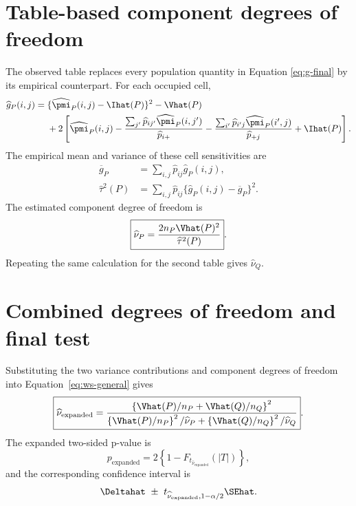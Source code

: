 \section{Table-based component degrees of freedom}

The observed table replaces every population quantity in Equation
\eqref{eq:g-final} by its empirical counterpart. For each occupied cell,
\begin{equation}
\begin{aligned}
\widehat g_P(i,j)
={}&\{\widehat\pmi_P(i,j)-\Ihat(P)\}^2-\Vhat(P)\\
&+2\left[
\widehat\pmi_P(i,j)
-\frac{\sum_{j'}\widehat p_{ij'}\widehat\pmi_P(i,j')}
       {\widehat p_{i+}}
-\frac{\sum_{i'}\widehat p_{i'j}\widehat\pmi_P(i',j)}
       {\widehat p_{+j}}
+\Ihat(P)
\right].
\end{aligned}
\label{eq:g-hat}
\end{equation}
The empirical mean and variance of these cell sensitivities are
\begin{align}
  \overline g_P
  &=\sum_{i,j}\widehat p_{ij}\widehat g_P(i,j),\\
  \widehat\tau^2(P)
  &=\sum_{i,j}\widehat p_{ij}
  \{\widehat g_P(i,j)-\overline g_P\}^2.
  \label{eq:tau-hat}
\end{align}
The estimated component degree of freedom is
\begin{equation}
  \boxed{
  \widehat\nu_P
  =\frac{2n_P\Vhat(P)^2}{\widehat\tau^2(P)}
  }.
  \label{eq:nu-p-hat}
\end{equation}
Repeating the same calculation for the second table gives
\(\widehat\nu_Q\).

\section{Combined degrees of freedom and final test}

Substituting the two variance contributions and component degrees of freedom
into Equation~\eqref{eq:ws-general} gives
\begin{equation}
  \boxed{
  \widehat\nu_{\mathrm{expanded}}
  =
  \frac{
  \left\{\Vhat(P)/n_P+\Vhat(Q)/n_Q\right\}^2
  }{
  \left\{\Vhat(P)/n_P\right\}^2/\widehat\nu_P
  +
  \left\{\Vhat(Q)/n_Q\right\}^2/\widehat\nu_Q
  }
  }.
  \label{eq:expanded-df}
\end{equation}
The expanded two-sided p-value is
\begin{equation}
  p_{\mathrm{expanded}}
  =2\left\{1-F_{t_{\widehat\nu_{\mathrm{expanded}}}}(|T|)\right\},
  \label{eq:expanded-p}
\end{equation}
and the corresponding confidence interval is
\begin{equation}
  \Deltahat
  \ \pm\
  t_{\widehat\nu_{\mathrm{expanded}},1-\alpha/2}\SEhat.
  \label{eq:expanded-ci}
\end{equation}

